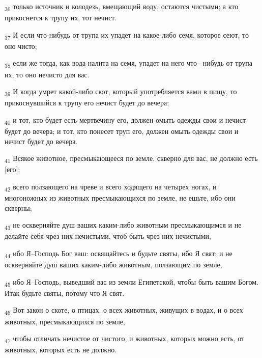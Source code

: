 \begin{tcolorbox}
\textsubscript{36} только источник и колодезь, вмещающий воду, остаются чистыми; а кто прикоснется к трупу их, тот нечист.
\end{tcolorbox}
\begin{tcolorbox}
\textsubscript{37} И если что-нибудь от трупа их упадет на какое-либо семя, которое сеют, то оно чисто;
\end{tcolorbox}
\begin{tcolorbox}
\textsubscript{38} если же тогда, как вода налита на семя, упадет на него что-- нибудь от трупа их, то оно нечисто для вас.
\end{tcolorbox}
\begin{tcolorbox}
\textsubscript{39} И когда умрет какой-либо скот, который употребляется вами в пищу, то прикоснувшийся к трупу его нечист будет до вечера;
\end{tcolorbox}
\begin{tcolorbox}
\textsubscript{40} и тот, кто будет есть мертвечину его, должен омыть одежды свои и нечист будет до вечера; и тот, кто понесет труп его, должен омыть одежды свои и нечист будет до вечера.
\end{tcolorbox}
\begin{tcolorbox}
\textsubscript{41} Всякое животное, пресмыкающееся по земле, скверно для вас, не должно есть [его];
\end{tcolorbox}
\begin{tcolorbox}
\textsubscript{42} всего ползающего на чреве и всего ходящего на четырех ногах, и многоножных из животных пресмыкающихся по земле, не ешьте, ибо они скверны;
\end{tcolorbox}
\begin{tcolorbox}
\textsubscript{43} не оскверняйте душ ваших каким-либо животным пресмыкающимся и не делайте себя чрез них нечистыми, чтоб быть чрез них нечистыми,
\end{tcolorbox}
\begin{tcolorbox}
\textsubscript{44} ибо Я--Господь Бог ваш: освящайтесь и будьте святы, ибо Я свят; и не оскверняйте душ ваших каким-либо животным, ползающим по земле,
\end{tcolorbox}
\begin{tcolorbox}
\textsubscript{45} ибо Я--Господь, выведший вас из земли Египетской, чтобы быть вашим Богом. Итак будьте святы, потому что Я свят.
\end{tcolorbox}
\begin{tcolorbox}
\textsubscript{46} Вот закон о скоте, о птицах, о всех животных, живущих в водах, и о всех животных, пресмыкающихся по земле,
\end{tcolorbox}
\begin{tcolorbox}
\textsubscript{47} чтобы отличать нечистое от чистого, и животных, которых можно есть, от животных, которых есть не должно.
\end{tcolorbox}
